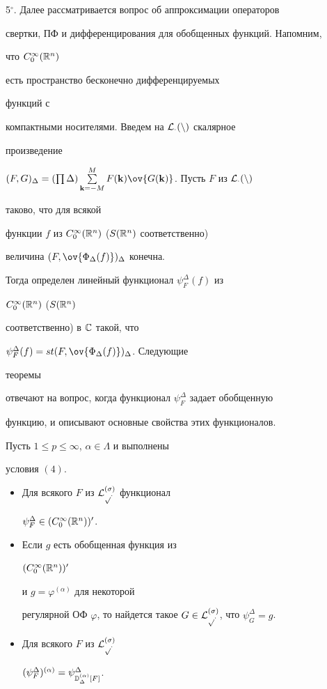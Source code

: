  


5${}^\circ$. Далее рассматривается вопрос об аппроксимации операторов 


свертки, ПФ и дифференцирования для обобщенных функций. Напомним, 


что $C^\infty_0(\Bbb R^n)$ 


есть пространство бесконечно дифференцируемых 


функций с 


компактными носителями. Введем на $\cal L_\Delta(n)$ скалярное 


произведение 


$(F,G)_\Delta=(\prod\Delta)\sum\limits^M_{\bold k=-M} 


F(\bold k)\ov{G(\bold k)}$. Пусть $F$ из $\cal L_\Delta(n)$ 


таково, что для всякой 


функции $f$ из $C^\infty_0(\Bbb R^n)$ ($S(\Bbb R^n)$ соответственно) 


величина $(F,\ov{\Phi_\Delta(f)})_\Delta$ конечна. 


Тогда определен линейный функционал $\psi^\Delta_F(f)$ из 


$C^\infty_0(\Bbb R^n)$ ($S(\Bbb R^n)$ 


соответственно) в $\Bbb C$ такой, что 


$\psi^\Delta_F(f)=st(F,\ov{\Phi_\Delta(f)})_\Delta$. Следующие 


теоремы 


отвечают на вопрос, когда функционал $\psi^\Delta_F$ задает обобщенную 


функцию, и описывают основные свойства этих функционалов. 


 


\begin{thm} Пусть $1\le p\le\infty$, $\alpha\in\Lambda$ и выполнены 


условия $(4)$. 


\begin{itemize} 


\item[1)] Для всякого $F$ из $\cal L^{(\sigma)}_{p\Delta}$ функционал 


$\psi^\Delta_F\in(C^\infty_0(\Bbb R^n))'$. 


\item[2)] Если $g$ есть обобщенная функция из 


$(C^\infty_0(\Bbb R^n))'$ 


и $g=\varphi^{(\alpha)}$ для некоторой 


регулярной ОФ $\varphi$, то найдется такое $G\in\cal 


L^{(\sigma)}_{p\Delta}$, что $\psi^\Delta_G=g$. 


\item[3)] Для всякого $F$ из $\cal L^{(\sigma)}_{p\Delta}$\; 


$(\psi^\Delta_F)^{(\alpha)}= 


\psi^\Delta_{\Bbb D^{(\alpha)}_\Delta[F]}$. 


\end{itemize} 


\end{thm} 


